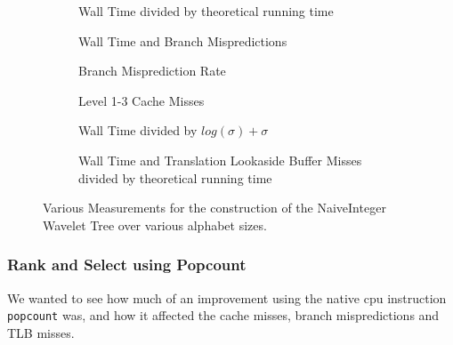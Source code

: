 \begin{figure}\tiny
	\begin{subfigure}{0.48\textwidth}
		
		\caption{Wall Time divided by theoretical running time}
		\label{fig:naiveIntegerAlphabetSize_WallTime}
	\end{subfigure}
	\hfill
	\begin{subfigure}{0.48\textwidth}
		
		\caption{Wall Time and Branch Mispredictions}
		\label{fig:naiveIntegerAlphabetSize_WallTime_BM}
	\end{subfigure}	
	
	\begin{subfigure}{0.48\textwidth}
		
		\caption{Branch Misprediction Rate}
		\label{fig:naiveIntegerAlphabetSize_BMRate}
	\end{subfigure}
	\hfill
	\begin{subfigure}{0.48\textwidth}
		
		\caption{Level 1-3 Cache Misses}
		\label{fig:naiveIntegerAlphabetSize_CM}
	\end{subfigure}
	
	\begin{subfigure}{0.48\textwidth}
		
		\caption{Wall Time divided by $log(\sigma) + \sigma$}
		\label{fig:naiveIntegerAlphabetSize_WallTime_plusSigma}
	\end{subfigure}
	\hfill
	\begin{subfigure}{0.48\textwidth}
		
		\caption{Wall Time and Translation Lookaside Buffer Misses divided by theoretical running time}
		\label{fig:naiveIntegerAlphabetSize_WallTime_TLB}
	\end{subfigure}
	\caption{Various Measurements for the construction of the NaiveInteger Wavelet Tree over various alphabet sizes.}
	\label{fig:naiveIntegerAlphabetSize}
\end{figure}
\restoregeometry
\clearpage

\subsubsection{Rank and Select using Popcount}
\label{sec:experimentPopcountRankSelect}
We wanted to see how much of an improvement using the native cpu instruction \texttt{popcount} was, and how it affected the cache misses, branch mispredictions and TLB misses.



